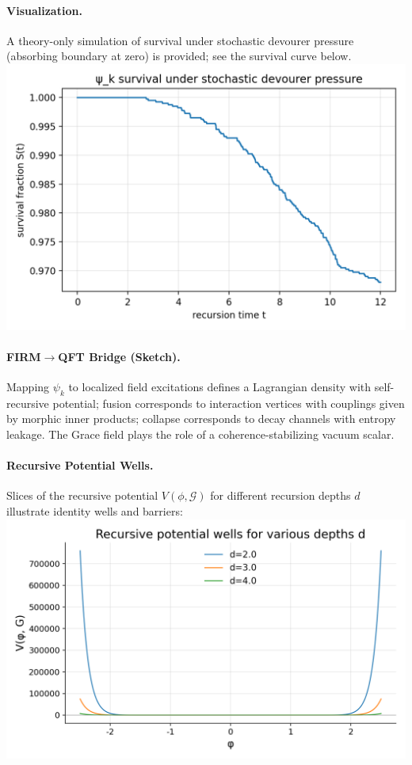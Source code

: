 \paragraph{Visualization.} A theory-only simulation of survival under stochastic
devourer pressure (absorbing boundary at zero) is provided; see the survival
curve below.
\\
\noindent\includegraphics[width=0.75\linewidth]{figures/morphic_survival_curve.png}

\paragraph{FIRM$\to$QFT Bridge (Sketch).} Mapping $\psi_k$ to localized field
excitations defines a Lagrangian density with self-recursive potential;
fusion corresponds to interaction vertices with couplings given by morphic
inner products; collapse corresponds to decay channels with entropy leakage.
The Grace field plays the role of a coherence-stabilizing vacuum scalar.

\paragraph{Recursive Potential Wells.} Slices of the recursive potential $V(\phi,\mathcal G)$
for different recursion depths $d$ illustrate identity wells and barriers:
\\
\noindent\includegraphics[width=0.85\linewidth]{figures/recursive_potential_wells.png}


